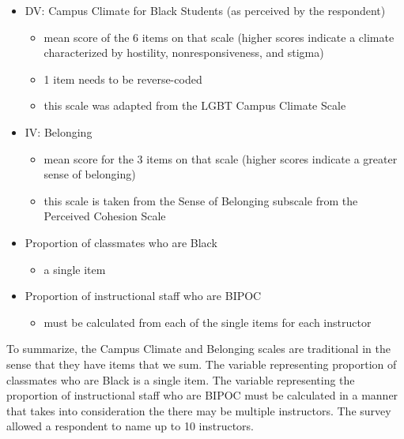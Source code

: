 \documentclass[
  11pt,
]{book}
\providecommand{\tightlist}{%
  \setlength{\itemsep}{0pt}\setlength{\parskip}{0pt}}
\begin{document}
\begin{itemize}
\tightlist
\item
  DV: Campus Climate for Black Students (as perceived by the respondent)

  \begin{itemize}
  \tightlist
  \item
    mean score of the 6 items on that scale (higher scores indicate a climate characterized by hostility, nonresponsiveness, and stigma)
  \item
    1 item needs to be reverse-coded
  \item
    this scale was adapted from the LGBT Campus Climate Scale \citep{szymanski_perceptions_2020}
  \end{itemize}
\item
  IV: Belonging

  \begin{itemize}
  \tightlist
  \item
    mean score for the 3 items on that scale (higher scores indicate a greater sense of belonging)
  \item
    this scale is taken from the Sense of Belonging subscale from the Perceived Cohesion Scale \citep{bollen_perceived_1990}
  \end{itemize}
\item
  Proportion of classmates who are Black

  \begin{itemize}
  \tightlist
  \item
    a single item
  \end{itemize}
\item
  Proportion of instructional staff who are BIPOC

  \begin{itemize}
  \tightlist
  \item
    must be calculated from each of the single items for each instructor
  \end{itemize}
\end{itemize}

To summarize, the Campus Climate and Belonging scales are traditional in the sense that they have items that we sum. The variable representing proportion of classmates who are Black is a single item. The variable representing the proportion of instructional staff who are BIPOC must be calculated in a manner that takes into consideration the there may be multiple instructors. The survey allowed a respondent to name up to 10 instructors.
\end{document}
